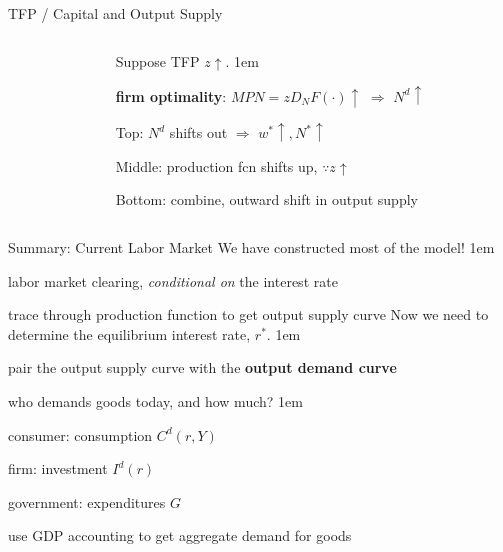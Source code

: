 \documentclass[11pt,aspectratio=43,usenames,dvipsnames]{beamer}
\let\olditemize=\itemize
\let\endolditemize=\enditemize
\renewenvironment{itemize}{\olditemize \itemsep1em}{\endolditemize}
\theoremstyle{definition}
\begin{document}
\begin{frame}{TFP / Capital and Output Supply}
\begin{columns}
\begin{column}{0.5\textwidth}
\begin{tikzpicture}
            \end{tikzpicture}
        \end{column}
        \begin{column}{0.5\textwidth}
            Suppose TFP $ z \uparrow  $.
            \begin{itemize}
                \item \textbf{firm optimality}: $ MPN = z D_{N}F( \cdot ) \uparrow  $ $ \Rightarrow  $ $ N^{d} \uparrow  $
                \item Top: $ N^{d} $ shifts out $ \Rightarrow  $ $ w^{*} \uparrow, N^{*} \uparrow  $
                \item Middle: production fcn shifts up, $ \because z \uparrow $
                \item Bottom: combine, outward shift in output supply
            \end{itemize}
        \end{column}
    \end{columns}
\end{frame}

\begin{frame}{Summary: Current Labor Market}
\label{slide:Summary__Current_Labor_Market}
    We have constructed most of the model!
    \begin{itemize}
        \item \alert{labor market clearing}, \textit{conditional on} the interest rate
        \item trace through production function to get \alert{output supply curve}
    \end{itemize}
    Now we need to determine the \alert{equilibrium interest rate}, $ r^{*} $.
    \begin{itemize}
        \item pair the \alert{output supply curve} with the \textbf{output demand curve}
        \item who demands goods today, and how much?
        \begin{itemize}
            \item consumer: consumption $ C^{d}( r, Y ) $
            \item firm: investment $ I^{d}( r ) $
            \item government: expenditures $ G $
            \item use GDP accounting to get aggregate demand for goods
        \end{itemize}
    \end{itemize}
\end{frame}
\end{document}
